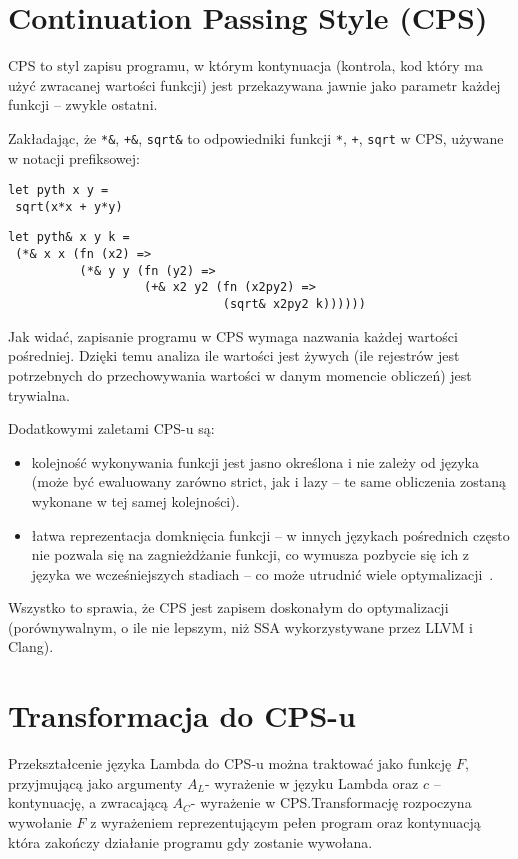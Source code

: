\documentclass[11pt]{scrartcl}
\begin{document}
\section{Continuation Passing Style (CPS)}
CPS to styl zapisu programu, w którym kontynuacja (kontrola, kod który ma użyć
zwracanej wartości funkcji) jest przekazywana jawnie jako parametr każdej
funkcji -- zwykle ostatni.

Zakładając, że \lstinline|*&|, \lstinline|+&|, \lstinline|sqrt&| to  odpowiedniki funkcji \lstinline|*|, \lstinline|+|, \lstinline|sqrt|  w CPS, używane
w notacji prefiksowej:
\begin{lstlisting}[caption=Typowy Program]
let pyth x y =
 sqrt(x*x + y*y)
\end{lstlisting}
\begin{lstlisting}[caption=Ten sam program w CPS]
let pyth& x y k =
 (*& x x (fn (x2) =>
          (*& y y (fn (y2) =>
                   (+& x2 y2 (fn (x2py2) =>
                              (sqrt& x2py2 k))))))

\end{lstlisting}


Jak widać, zapisanie programu w CPS wymaga nazwania każdej wartości pośredniej.
Dzięki temu analiza ile wartości jest żywych (ile rejestrów jest potrzebnych do
przechowywania wartości w danym momencie obliczeń) jest trywialna.


Dodatkowymi zaletami CPS-u są:
\begin{itemize}
\item kolejność wykonywania funkcji jest jasno określona i nie zależy od
  języka (może być ewaluowany zarówno strict, jak i lazy -- te same obliczenia
  zostaną wykonane w tej samej kolejności).
\item łatwa reprezentacja domknięcia funkcji -- w innych językach pośrednich
  często nie pozwala się na zagnieżdżanie funkcji, co wymusza pozbycie się ich z
  języka we wcześniejszych stadiach -- co może utrudnić wiele
  optymalizacji~\cite[Chapter 1.2: Advantages of CPS]{Appel}.
\end{itemize}
Wszystko to sprawia, że CPS jest zapisem doskonałym do optymalizacji
(porównywalnym, o ile nie lepszym, niż SSA wykorzystywane przez LLVM i Clang).



\section{Transformacja do CPS-u}
Przekształcenie języka Lambda do CPS-u można traktować jako funkcję $F$,
przyjmującą jako argumenty $A_L$- wyrażenie w języku Lambda oraz $c$ -- kontynuację, a
zwracającą $A_C$- wyrażenie w CPS.\@ Transformację rozpoczyna wywołanie $F$ z
wyrażeniem reprezentującym pełen program oraz kontynuacją która zakończy
działanie programu gdy zostanie wywołana.
\end{document}
